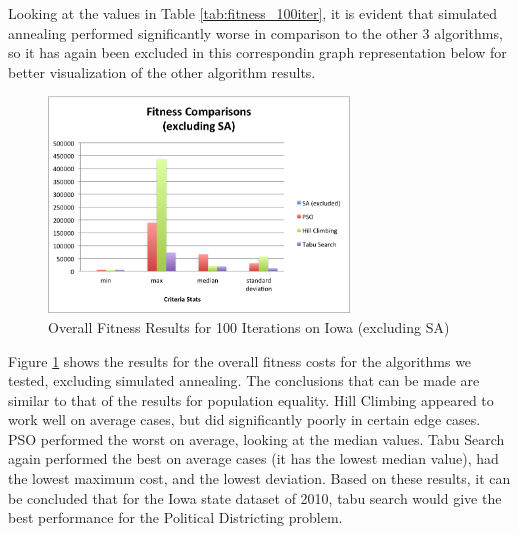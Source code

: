 \documentclass[journal]{IEEEtran}
\begin{document}
Looking at the values in Table \ref{tab:fitness_100iter}, it is evident that simulated annealing performed significantly worse in comparison to the other 3 algorithms, so it has again been excluded in this correspondin graph representation below for better visualization of the other algorithm results. 

\begin{figure}[h!]
    \includegraphics[width=8cm]{images/fitness_graph.png}
    \centering
    \caption{Overall Fitness Results for 100 Iterations on Iowa (excluding SA)}
    \label{fig:fitness_results}
\end{figure}

Figure \ref{fig:fitness_results} shows the results for the overall fitness costs for the algorithms we tested, excluding simulated annealing. The conclusions that can be made are similar to that of the results for population equality. Hill Climbing appeared to work well on average cases, but did significantly poorly in certain edge cases. PSO performed the worst on average, looking at the median values. Tabu Search again performed the best on average cases (it has the lowest median value), had the lowest maximum cost, and the lowest deviation. Based on these results, it can be concluded that for the Iowa state dataset of 2010, tabu search would give the best performance for the Political Districting problem. 
\end{document}
